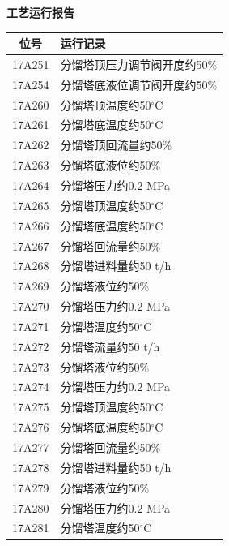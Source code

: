 \documentclass[UTF8,10pt,a4paper,fontset=fandol]{ctexart}
\begin{document}

\newpage

\begin{center}
\small
\begin{minipage}[t]{0.47\textwidth}
\centering
\textbf{工艺运行报告}

\begin{tabularx}{\linewidth}{|c|>{\RaggedRight\arraybackslash}X|}
\hline
\textbf{位号} & \textbf{运行记录} \\ \hline
17A251 & 分馏塔顶压力调节阀开度约50\% \\ \hline
17A254 & 分馏塔底液位调节阀开度约50\% \\ \hline
17A260 & 分馏塔顶温度约50$^\circ$C \\ \hline
17A261 & 分馏塔底温度约50$^\circ$C \\ \hline
17A262 & 分馏塔顶回流量约50\% \\ \hline
17A263 & 分馏塔底液位约50\% \\ \hline
17A264 & 分馏塔压力约0.2 MPa \\ \hline
17A265 & 分馏塔顶温度约50$^\circ$C \\ \hline
17A266 & 分馏塔底温度约50$^\circ$C \\ \hline
17A267 & 分馏塔回流量约50\% \\ \hline
17A268 & 分馏塔进料量约50 t/h \\ \hline
17A269 & 分馏塔液位约50\% \\ \hline
17A270 & 分馏塔压力约0.2 MPa \\ \hline
17A271 & 分馏塔温度约50$^\circ$C \\ \hline
17A272 & 分馏塔流量约50 t/h \\ \hline
17A273 & 分馏塔液位约50\% \\ \hline
17A274 & 分馏塔压力约0.2 MPa \\ \hline
17A275 & 分馏塔顶温度约50$^\circ$C \\ \hline
17A276 & 分馏塔底温度约50$^\circ$C \\ \hline
17A277 & 分馏塔回流量约50\% \\ \hline
17A278 & 分馏塔进料量约50 t/h \\ \hline
17A279 & 分馏塔液位约50\% \\ \hline
17A280 & 分馏塔压力约0.2 MPa \\ \hline
17A281 & 分馏塔温度约50$^\circ$C \\ \hline

\end{tabularx}
\end{minipage}
\end{center}
\end{document}
